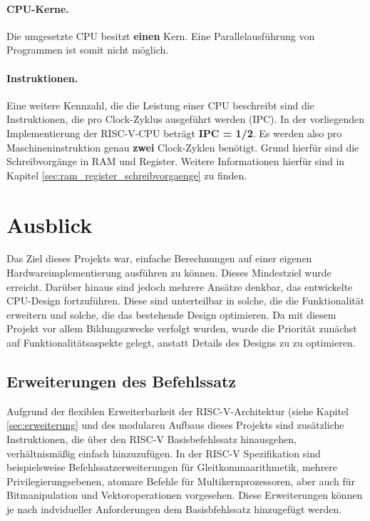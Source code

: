\paragraph{CPU-Kerne.} Die umgesetzte CPU besitzt \textbf{einen} Kern.
Eine Parallelausführung von Programmen ist somit nicht möglich.

\paragraph{Instruktionen.} Eine weitere Kennzahl, die die Leistung einer
CPU beschreibt sind die Instruktionen, die pro Clock-Zyklus ausgeführt
werden (IPC). 
In der vorliegenden Implementierung der RISC-V-CPU beträgt \textbf{IPC =
1/2}. Es werden also pro Maschineninstruktion genau \textbf{zwei}
Clock-Zyklen benötigt. Grund hierfür sind die Schreibvorgänge in RAM und
Register. Weitere Informationen hierfür sind in Kapitel
\ref{sec:ram_register_schreibvorgaenge} zu finden.

\section{Ausblick}

Das Ziel dieses Projekts war, einfache Berechnungen auf einer eigenen Hardwareimplementierung ausführen zu können. Dieses Mindestziel wurde erreicht. Darüber hinaus sind jedoch mehrere Ansätze denkbar, das entwickelte CPU-Design fortzuführen. Diese sind unterteilbar in solche, die die Funktionalität erweitern und solche, die das bestehende Design optimieren. Da mit diesem Projekt vor allem Bildungszwecke verfolgt wurden, wurde die Priorität zunächst auf Funktionalitätsaspekte gelegt, anstatt Details des Designs zu zu optimieren.

\subsection{Erweiterungen des Befehlssatz}

Aufgrund der flexiblen Erweiterbarkeit der RISC-V-Architektur (siehe Kapitel \ref{sec:erweiterung} und des modularen Aufbaus dieses Projekts sind zusätzliche Instruktionen, die über den RISC-V Basisbefehlssatz hinausgehen, verhältnismäßig einfach hinzuzufügen. In der RISC-V Spezifikation sind beispielsweise Befehlssatzerweiterungen für Gleitkommaarithmetik, mehrere Privilegierungsebenen, atomare Befehle für Multikernprozessoren, aber auch für Bitmanipulation und Vektoroperationen vorgesehen. \cite[S. 4f.]{RISC} Diese Erweiterungen können je nach indvidueller Anforderungen dem Basisbfehlssatz hinzugefügt werden.
 
